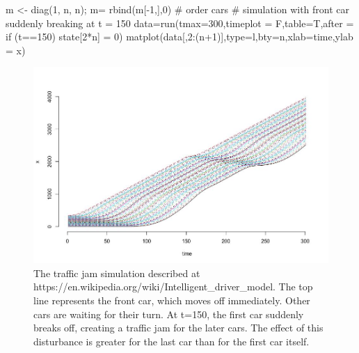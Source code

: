 \documentclass[
  letterpaper,
]{scrbook}
\newenvironment{Shaded}{\begin{snugshade}}{\end{snugshade}}
\newcommand{\AttributeTok}[1]{\textcolor[rgb]{0.40,0.45,0.13}{#1}}
\newcommand{\CommentTok}[1]{\textcolor[rgb]{0.37,0.37,0.37}{#1}}
\newcommand{\DecValTok}[1]{\textcolor[rgb]{0.68,0.00,0.00}{#1}}
\newcommand{\FunctionTok}[1]{\textcolor[rgb]{0.28,0.35,0.67}{#1}}
\newcommand{\NormalTok}[1]{\textcolor[rgb]{0.00,0.23,0.31}{#1}}
\newcommand{\OtherTok}[1]{\textcolor[rgb]{0.00,0.23,0.31}{#1}}
\newcommand{\SpecialCharTok}[1]{\textcolor[rgb]{0.37,0.37,0.37}{#1}}
\newcommand{\StringTok}[1]{\textcolor[rgb]{0.13,0.47,0.30}{#1}}
\begin{document}
\begin{Shaded}
\begin{Highlighting}[]
\NormalTok{m }\OtherTok{\textless{}{-}} \FunctionTok{diag}\NormalTok{(}\DecValTok{1}\NormalTok{, n, n); m}\OtherTok{=} \FunctionTok{rbind}\NormalTok{(m[}\SpecialCharTok{{-}}\DecValTok{1}\NormalTok{,],}\DecValTok{0}\NormalTok{) }\CommentTok{\# order cars}
\CommentTok{\# simulation with front car suddenly breaking at t = 150}
\NormalTok{data}\OtherTok{=}\FunctionTok{run}\NormalTok{(}\AttributeTok{tmax=}\DecValTok{300}\NormalTok{,}\AttributeTok{timeplot =}\NormalTok{ F,}\AttributeTok{table=}\NormalTok{T,}\AttributeTok{after =} \StringTok{\textquotesingle{}if (t==150) state[2*n] = 0\textquotesingle{}}\NormalTok{)}
\FunctionTok{matplot}\NormalTok{(data[,}\DecValTok{2}\SpecialCharTok{:}\NormalTok{(n}\SpecialCharTok{+}\DecValTok{1}\NormalTok{)],}\AttributeTok{type=}\StringTok{\textquotesingle{}l\textquotesingle{}}\NormalTok{,}\AttributeTok{bty=}\StringTok{\textquotesingle{}n\textquotesingle{}}\NormalTok{,}\AttributeTok{xlab=}\StringTok{\textquotesingle{}time\textquotesingle{}}\NormalTok{,}\AttributeTok{ylab =} \StringTok{\textquotesingle{}x\textquotesingle{}}\NormalTok{)}
\end{Highlighting}
\end{Shaded}

\begin{figure}

{\centering \includegraphics[width=4.77593in,height=\textheight]{media/ch5/image6.jpg}

}

\caption{\label{fig-ch5-img6-old-54}The traffic jam simulation described
at https://en.wikipedia.org/wiki/Intelligent\_driver\_model. The top
line represents the front car, which moves off immediately. Other cars
are waiting for their turn. At t=150, the first car suddenly breaks off,
creating a traffic jam for the later cars. The effect of this
disturbance is greater for the last car than for the first car itself.}

\end{figure}
\end{document}
